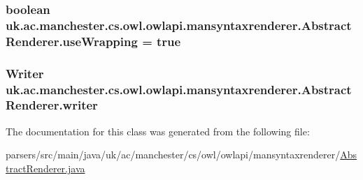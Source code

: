 \hypertarget{classuk_1_1ac_1_1manchester_1_1cs_1_1owl_1_1owlapi_1_1mansyntaxrenderer_1_1_abstract_renderer_a94b91733f23aa843bd3f93e1bf385b3f}{
\subsubsection[{use\-Wrapping}]{\setlength{\rightskip}{0pt plus 5cm}boolean uk.\-ac.\-manchester.\-cs.\-owl.\-owlapi.\-mansyntaxrenderer.\-Abstract\-Renderer.\-use\-Wrapping = true\hspace{0.3cm}{\ttfamily [private]}}}\label{classuk_1_1ac_1_1manchester_1_1cs_1_1owl_1_1owlapi_1_1mansyntaxrenderer_1_1_abstract_renderer_a94b91733f23aa843bd3f93e1bf385b3f}
\hypertarget{classuk_1_1ac_1_1manchester_1_1cs_1_1owl_1_1owlapi_1_1mansyntaxrenderer_1_1_abstract_renderer_aa1198fed3e789d2e588e8c5708ecd539}{
\subsubsection[{writer}]{\setlength{\rightskip}{0pt plus 5cm}Writer uk.\-ac.\-manchester.\-cs.\-owl.\-owlapi.\-mansyntaxrenderer.\-Abstract\-Renderer.\-writer\hspace{0.3cm}{\ttfamily [private]}}}\label{classuk_1_1ac_1_1manchester_1_1cs_1_1owl_1_1owlapi_1_1mansyntaxrenderer_1_1_abstract_renderer_aa1198fed3e789d2e588e8c5708ecd539}


The documentation for this class was generated from the following file\-:\begin{DoxyCompactItemize}
\item 
parsers/src/main/java/uk/ac/manchester/cs/owl/owlapi/mansyntaxrenderer/\hyperlink{_abstract_renderer_8java}{Abstract\-Renderer.\-java}\end{DoxyCompactItemize}
